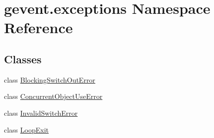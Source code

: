\hypertarget{namespacegevent_1_1exceptions}{}\section{gevent.\+exceptions Namespace Reference}
\label{namespacegevent_1_1exceptions}
\subsection*{Classes}
\begin{DoxyCompactItemize}
\item 
class \hyperlink{classgevent_1_1exceptions_1_1_blocking_switch_out_error}{Blocking\+Switch\+Out\+Error}
\item 
class \hyperlink{classgevent_1_1exceptions_1_1_concurrent_object_use_error}{Concurrent\+Object\+Use\+Error}
\item 
class \hyperlink{classgevent_1_1exceptions_1_1_invalid_switch_error}{Invalid\+Switch\+Error}
\item 
class \hyperlink{classgevent_1_1exceptions_1_1_loop_exit}{Loop\+Exit}
\end{DoxyCompactItemize}
